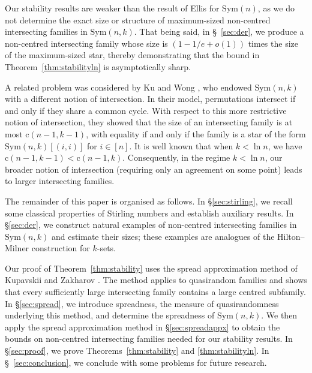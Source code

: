 \documentclass{amsart}
\newcommand{\sym}{\mathrm{Sym}}
\newcommand{\st}{\mathrm{c}}
\begin{document}
Our stability results are weaker than the result of Ellis \cite{Ellisstability} for $\sym(n)$, as we do not determine the exact size or structure of maximum-sized non-centred intersecting families in
$\sym(n,k)$. That being said, in \S~\ref{sec:der}, we produce a non-centred intersecting family whose size is $(1-1/e+o(1))$ times the size of the maximum-sized star, thereby demonstrating that the bound in Theorem~\ref{thm:stabilityln} is asymptotically sharp. 

A related problem was considered by Ku and Wong \cite{kuwong}, who endowed $\sym(n,k)$ with a different notion of intersection. In their model, permutations intersect if and only if they share a common cycle. With respect to this more restrictive notion of intersection, they showed that the size of an intersecting family is at most $\st(n-1,k-1)$, with equality if and only if the family is a star of the form $\sym(n,k)[(i,i)]$ for $i \in [n]$. It is well known that when $k <\ln n$, we have $\st(n-1,k-1)< \st(n-1,k)$. Consequently, in the regime $k<\ln n$, our broader notion of intersection (requiring only an agreement on some point) leads to larger intersecting families.

The remainder of this paper is organised as follows. In \S\ref{sec:stirling}, we recall some classical properties of Stirling numbers and establish auxiliary results. In \S\ref{sec:der}, we construct natural examples of non-centred intersecting families in $\sym(n,k)$ and estimate their sizes; these examples are analogues of the Hilton--Milner construction for $k$-sets.

Our proof of Theorem~\ref{thm:stability} uses the spread approximation method of Kupavskii and Zakharov \cite{kupavskii2024spread}. The method applies to quasirandom families and shows that every sufficiently large intersecting family contains a large centred subfamily. In \S\ref{sec:spread}, we introduce spreadness, the measure of quasirandomness underlying this method, and determine the spreadness of $\sym(n,k)$. We then apply the spread approximation method in \S\ref{sec:spreadappx} to obtain the bounds on non-centred intersecting families needed for our stability results. In \S\ref{sec:proof}, we prove Theorems~\ref{thm:stability} and \ref{thm:stabilityln}. In \S~\ref{sec:conclusion}, we conclude with some problems for future research.
\end{document}
